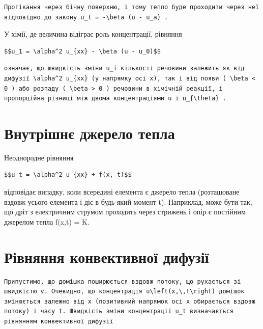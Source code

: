\documentclass[
  ukrainian,
]{article}
\begin{document}
\begin{verbatim}
Протікання через бічну поверхню, і тому тепло буде проходити через неї відповідно до закону u_t = -\beta (u - u_a) .
\end{verbatim}

У хімії, де величина відіграє роль концентрації, рівняння

\begin{verbatim}
$$u_1 = \alpha^2 u_{xx} - \beta (u - u_0)$$
\end{verbatim}

\begin{verbatim}
означає, що швидкість зміни u_i кількості речовини залежить як від дифузії \alpha^2 u_{xx} (у напрямку осі x), так і від появи ( \beta < 0 ) або розпаду ( \beta > 0 ) речовини в хімічній реакції, і пропорційна різниці між двома концентраціями u і u_{\theta} .
\end{verbatim}

\section{Внутрішнє джерело
тепла}\label{ux432ux43dux443ux442ux440ux456ux448ux43dux454-ux434ux436ux435ux440ux435ux43bux43e-ux442ux435ux43fux43bux430}

Неоднородне рівняння

\begin{verbatim}
$$u_t = \alpha^2 u_{xx} + f(x, t)$$
\end{verbatim}

відповідає випадку, коли всередині елемента є джерело тепла (розташоване
вздовж усього елемента і діє в будь-який момент t). Наприклад, може бути
так, що дріт з електричним струмом проходить через стрижень і опір є
постійним джерелом тепла f(x,t) = K.

\section{Рівняння конвективної
дифузії}\label{ux440ux456ux432ux43dux44fux43dux43dux44f-ux43aux43eux43dux432ux435ux43aux442ux438ux432ux43dux43eux457-ux434ux438ux444ux443ux437ux456ux457}

\begin{verbatim}
Припустимо, що домішка поширюється вздовж потоку, що рухається зі швидкістю v. Очевидно, що концентрація u\left(x,\,t\right) домішок змінюється залежно від x (позитивний напрямок осі x обирається вздовж потоку) і часу t. Швидкість зміни концентрації u_t визначається рівнянням конвективної дифузії
\end{verbatim}
\end{document}
